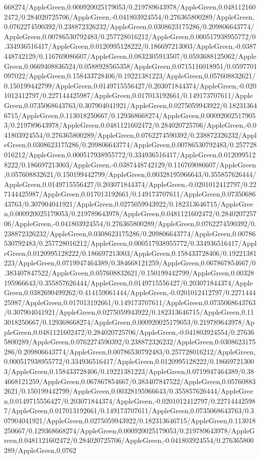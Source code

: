 {\begin{tikzternal}
{668274/AppleGreen,0.000920025179053/0.219789643978/AppleGreen,0.0481121602472/0.284020725706/AppleGreen,-0.041803924554/0.276365800289/AppleGreen,0.0762274590392/0.238872326232/AppleGreen,0.0308623175286/0.209806643774/AppleGreen,0.00786530792483/0.257728016212/AppleGreen,0.000517938955772/0.334936516417/AppleGreen,0.0120995128222/0.186697213003/AppleGreen,-0.0387448742129/0.116769086607/AppleGreen,0.0832305913507/0.0593688125062/AppleGreen,0.0669408836524/0.0588928565358/AppleGreen,0.0715116018951/0.0597701097022/AppleGreen,0.158433728406/0.19221381223/AppleGreen,0.057608832621/0.150199442799/AppleGreen,0.0149715556427/0.203071844374/AppleGreen,-0.0201012412797/0.227144425987/AppleGreen,0.017013192661/0.149173707611/AppleGreen,0.0735068643763/0.307904041921/AppleGreen,0.0275059943922/0.182313646715/AppleGreen,0.113018250667/0.129368668274/AppleGreen,0.000920025179053/0.219789643978/AppleGreen,0.0481121602472/0.284020725706/AppleGreen,-0.041803924554/0.276365800289/AppleGreen,0.0762274590392/0.238872326232/AppleGreen,0.0308623175286/0.209806643774/AppleGreen,0.00786530792483/0.257728016212/AppleGreen,0.000517938955772/0.334936516417/AppleGreen,0.0120995128222/0.186697213003/AppleGreen,-0.0387448742129/0.116769086607/AppleGreen,0.057608832621/0.150199442799/AppleGreen,0.00328195966643/0.355857626444/AppleGreen,0.0149715556427/0.203071844374/AppleGreen,-0.0201012412797/0.227144425987/AppleGreen,0.017013192661/0.149173707611/AppleGreen,0.0735068643763/0.307904041921/AppleGreen,0.0275059943922/0.182313646715/AppleGreen,0.000920025179053/0.219789643978/AppleGreen,0.0481121602472/0.284020725706/AppleGreen,-0.041803924554/0.276365800289/AppleGreen,0.0762274590392/0.238872326232/AppleGreen,0.0308623175286/0.209806643774/AppleGreen,0.00786530792483/0.257728016212/AppleGreen,0.000517938955772/0.334936516417/AppleGreen,0.0120995128222/0.186697213003/AppleGreen,0.158433728406/0.19221381223/AppleGreen,0.0719947464389/0.384668121259/AppleGreen,0.067867854667/0.383407847522/AppleGreen,0.057608832621/0.150199442799/AppleGreen,0.00328195966643/0.355857626444/AppleGreen,0.0149715556427/0.203071844374/AppleGreen,0.0382690499262/0.414159061444/AppleGreen,-0.0201012412797/0.227144425987/AppleGreen,0.017013192661/0.149173707611/AppleGreen,0.0735068643763/0.307904041921/AppleGreen,0.0275059943922/0.182313646715/AppleGreen,0.113018250667/0.129368668274/AppleGreen,0.000920025179053/0.219789643978/AppleGreen,0.0481121602472/0.284020725706/AppleGreen,-0.041803924554/0.276365800289/AppleGreen,0.0762274590392/0.238872326232/AppleGreen,0.0308623175286/0.209806643774/AppleGreen,0.00786530792483/0.257728016212/AppleGreen,0.000517938955772/0.334936516417/AppleGreen,0.0120995128222/0.186697213003/AppleGreen,0.158433728406/0.19221381223/AppleGreen,0.0719947464389/0.384668121259/AppleGreen,0.067867854667/0.383407847522/AppleGreen,0.057608832621/0.150199442799/AppleGreen,0.00328195966643/0.355857626444/AppleGreen,0.0149715556427/0.203071844374/AppleGreen,-0.0201012412797/0.227144425987/AppleGreen,0.017013192661/0.149173707611/AppleGreen,0.0735068643763/0.307904041921/AppleGreen,0.0275059943922/0.182313646715/AppleGreen,0.113018250667/0.129368668274/AppleGreen,0.000920025179053/0.219789643978/AppleGreen,0.0481121602472/0.284020725706/AppleGreen,-0.041803924554/0.276365800289/AppleGreen,0.0762}
\end{tikzternal}}
